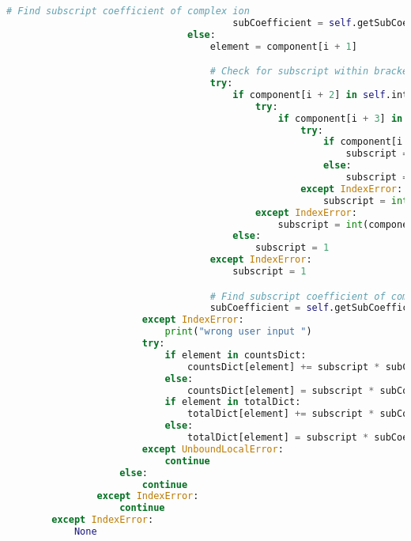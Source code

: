 \documentclass[a4paper,12pt]{article}
\begin{document}
\begin{lstlisting}[language=Python, caption=parseComponent method for finding elements, label={lst:parsecomponent}]
                                        # Find subscript coefficient of complex ion
                                        subCoefficient = self.getSubCoefficient(component)
                                else:
                                    element = component[i + 1]

                                    # Check for subscript within brackets
                                    try:
                                        if component[i + 2] in self.integers:
                                            try:
                                                if component[i + 3] in self.integers:
                                                    try:
                                                        if component[i + 4] in self.integers:
                                                            subscript = int(component[(i + 2): (i + 5)])
                                                        else:
                                                            subscript = int(component[(i + 2): (i + 4)])
                                                    except IndexError:
                                                        subscript = int(component[(i + 2): (i + 4)])
                                            except IndexError:
                                                subscript = int(component[i + 2])
                                        else:
                                            subscript = 1
                                    except IndexError:
                                        subscript = 1

                                    # Find subscript coefficient of complex ion
                                    subCoefficient = self.getSubCoefficient(component)
                        except IndexError:
                            print("wrong user input ")
                        try:
                            if element in countsDict:
                                countsDict[element] += subscript * subCoefficient * coefficient
                            else:
                                countsDict[element] = subscript * subCoefficient * coefficient
                            if element in totalDict:
                                totalDict[element] += subscript * subCoefficient * coefficient
                            else:
                                totalDict[element] = subscript * subCoefficient * coefficient
                        except UnboundLocalError:
                            continue
                    else:
                        continue
                except IndexError:
                	continue
        except IndexError:
            None
\end{lstlisting}
\end{document}
